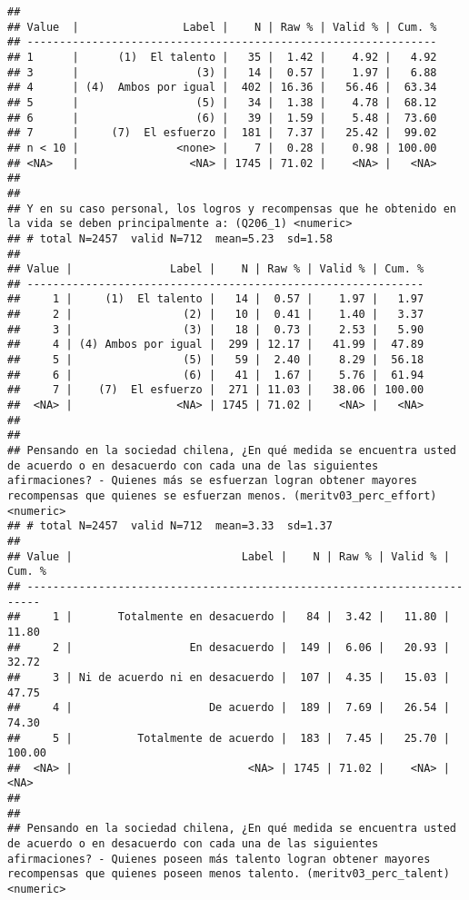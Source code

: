\documentclass[
  10,
  landscape,
  legalpaper]{article}
\begin{document}
\begin{verbatim}
## 
## Value  |                Label |    N | Raw % | Valid % | Cum. %
## ---------------------------------------------------------------
## 1      |      (1)  El talento |   35 |  1.42 |    4.92 |   4.92
## 3      |                  (3) |   14 |  0.57 |    1.97 |   6.88
## 4      | (4)  Ambos por igual |  402 | 16.36 |   56.46 |  63.34
## 5      |                  (5) |   34 |  1.38 |    4.78 |  68.12
## 6      |                  (6) |   39 |  1.59 |    5.48 |  73.60
## 7      |     (7)  El esfuerzo |  181 |  7.37 |   25.42 |  99.02
## n < 10 |               <none> |    7 |  0.28 |    0.98 | 100.00
## <NA>   |                 <NA> | 1745 | 71.02 |    <NA> |   <NA>
## 
## 
## Y en su caso personal, los logros y recompensas que he obtenido en la vida se deben principalmente a: (Q206_1) <numeric>
## # total N=2457  valid N=712  mean=5.23  sd=1.58
## 
## Value |               Label |    N | Raw % | Valid % | Cum. %
## -------------------------------------------------------------
##     1 |     (1)  El talento |   14 |  0.57 |    1.97 |   1.97
##     2 |                 (2) |   10 |  0.41 |    1.40 |   3.37
##     3 |                 (3) |   18 |  0.73 |    2.53 |   5.90
##     4 | (4) Ambos por igual |  299 | 12.17 |   41.99 |  47.89
##     5 |                 (5) |   59 |  2.40 |    8.29 |  56.18
##     6 |                 (6) |   41 |  1.67 |    5.76 |  61.94
##     7 |    (7)  El esfuerzo |  271 | 11.03 |   38.06 | 100.00
##  <NA> |                <NA> | 1745 | 71.02 |    <NA> |   <NA>
## 
## 
## Pensando en la sociedad chilena, ¿En qué medida se encuentra usted de acuerdo o en desacuerdo con cada una de las siguientes afirmaciones? - Quienes más se esfuerzan logran obtener mayores recompensas que quienes se esfuerzan menos. (meritv03_perc_effort) <numeric>
## # total N=2457  valid N=712  mean=3.33  sd=1.37
## 
## Value |                          Label |    N | Raw % | Valid % | Cum. %
## ------------------------------------------------------------------------
##     1 |       Totalmente en desacuerdo |   84 |  3.42 |   11.80 |  11.80
##     2 |                  En desacuerdo |  149 |  6.06 |   20.93 |  32.72
##     3 | Ni de acuerdo ni en desacuerdo |  107 |  4.35 |   15.03 |  47.75
##     4 |                     De acuerdo |  189 |  7.69 |   26.54 |  74.30
##     5 |          Totalmente de acuerdo |  183 |  7.45 |   25.70 | 100.00
##  <NA> |                           <NA> | 1745 | 71.02 |    <NA> |   <NA>
## 
## 
## Pensando en la sociedad chilena, ¿En qué medida se encuentra usted de acuerdo o en desacuerdo con cada una de las siguientes afirmaciones? - Quienes poseen más talento logran obtener mayores recompensas que quienes poseen menos talento. (meritv03_perc_talent) <numeric>

\end{verbatim}
\end{document}
